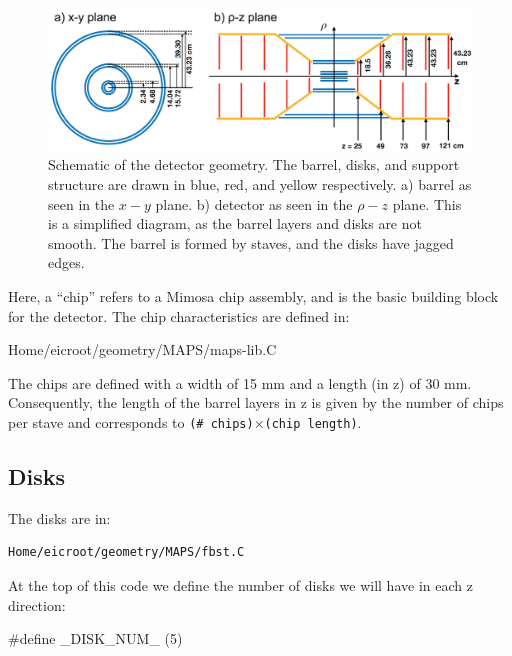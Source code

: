 \documentclass[12pt]{article}
\begin{document}
\begin{figure}
\centering
\includegraphics[width=\textwidth]{figures/geometry_details.jpg}
\caption{Schematic of the detector geometry. The barrel, disks, and support structure are drawn in blue, red, and yellow respectively.
a) barrel as seen in the $x-y$ plane. b) detector as seen in the $\rho-z$ plane.
This is a simplified diagram, as the barrel layers and disks are not smooth. The barrel is formed by staves, and the disks have jagged edges.}
\label{fig:geom}
\end{figure}

Here, a ``chip'' refers to a Mimosa chip assembly, and is the basic building block for the detector.
The chip characteristics are defined in:

\begin{tcolorbox}
\begin{verbnobox}[\scriptsize]
Home/eicroot/geometry/MAPS/maps-lib.C
\end{verbnobox}  
\end{tcolorbox}

The chips are defined with a width of 15 mm and a length (in z) of 30 mm. Consequently, the length of the barrel layers in z is given by
the number of chips per stave and corresponds to \verb|(# chips)|$\times$\verb|(chip length)|.

\subsection{Disks}

The disks are in:

\begin{tcolorbox}
\begin{verbatim}
Home/eicroot/geometry/MAPS/fbst.C
\end{verbatim}  
\end{tcolorbox}

At the top of this code we define the number of disks we will have in each z direction:

\begin{tcolorbox}
\begin{verbnobox}[\scriptsize]
#define _DISK_NUM_ (5)
\end{verbnobox}  
\end{tcolorbox}
\end{document}

